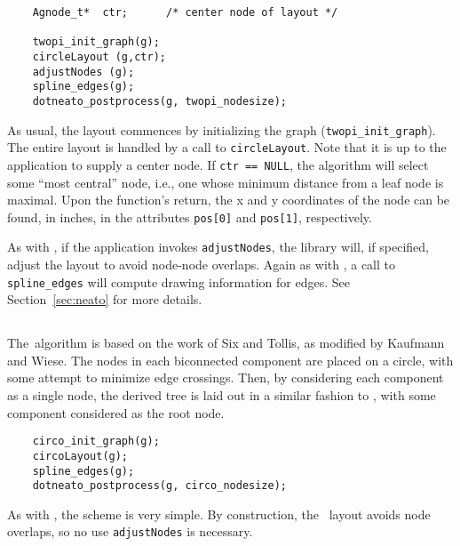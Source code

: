 \begin{verbatim}
    Agnode_t*  ctr;      /* center node of layout */

    twopi_init_graph(g);
    circleLayout (g,ctr);
    adjustNodes (g);
    spline_edges(g);
    dotneato_postprocess(g, twopi_nodesize);
\end{verbatim}

As usual, the layout commences by initializing the graph 
({\tt twopi\_init\_graph}). The entire layout is handled by a call
to {\tt circleLayout}. Note that it is up to the application to supply
a center node. If {\tt ctr == NULL}, the algorithm will select some
``most central'' node, i.e., one whose minimum distance from a leaf
node is maximal. Upon the function's return, the x and y coordinates of
the node can be found, in inches, in the 
attributes {\tt pos[0]} and {\tt pos[1]}, respectively.

As with \neato, if the application invokes {\tt adjustNodes}, 
the library will, if specified, adjust the layout to avoid node-node
overlaps. Again as with \neato, a call to 
{\tt spline\_edges} will compute drawing information for edges. See
Section~\ref{sec:neato} for more details.

\subsection{\circo}
\label{sec:circo}

The\circo\ algorithm is based on the work of Six and Tollis\cite{st,st2},
as modified by Kaufmann and Wiese\cite{kw}. The nodes in each 
biconnected component are placed on a circle, with some attempt to 
minimize edge crossings. Then, by considering each component as a single
node, the derived tree is laid out in a similar fashion to \twopi,
with some component considered as the root node.

\begin{verbatim}
    circo_init_graph(g);
    circoLayout(g);
    spline_edges(g);
    dotneato_postprocess(g, circo_nodesize);
\end{verbatim}

As with \fdp, the scheme is very simple.
By construction, the \circo\ layout avoids node overlaps, so no use
{\tt adjustNodes} is necessary.

